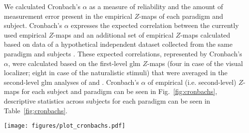 %
We calculated Cronbach's $\alpha$ as a measure of reliability and the amount of
measurement error \citep{cronbach1951coefficient, cortina1993coefficient}
present in the empirical $Z$-maps of each paradigm and subject.
%
Cronbach's $\alpha$ expresses the expected correlation between the currently
used empirical $Z$-maps and an additional set of empirical $Z$-maps calculated
based on data of a hypothetical independent dataset collected from the same
paradigm and subjects \citep{jiahui2020predicting, jiahui2022cross}.
%
These expected correlations, represented by Cronbach's $\alpha$, were calculated
based on the first-level \ac{glm} $Z$-maps (four in case of the visual
localizer; eight in case of the naturalistic stimuli) that were averaged in the
second-level \ac{glm} analyses of \citet{sengupta2016extension} and
\citet{haeusler2022processing}.
%
Cronbach's $\alpha$ of empirical (i.e. second-level) $Z$-maps for each subject
and paradigm can be seen in Fig.~\ref{fig:cronbachs}, descriptive statistics
across subjects for each paradigm can be seen in Table~\ref{fig:cronbachs}.





\begin{figure*}[tbp] \centering
    \texttt{[image: figures/plot\_cronbachs.pdf]}
    \caption{\textbf{Cronbach's $\alpha$ of the empirical $Z$-maps for each
    paradigm and subject.}
    Cronbach's $\alpha$ was calculated based on the $Z$-maps yielded by the
    first-level \ac{glm} analyses of the visual localizer
    \citep{sengupta2016extension} (four runs) and naturalistic stimuli
    \citep{haeusler2022processing} (eight segments each) respectively.
    The second-level \ac{glm} analyses across runs / segments yielded the
    empirical $Z$-maps that were estimated in the present study.
    }
    \label{fig:cronbachs}
\end{figure*}


